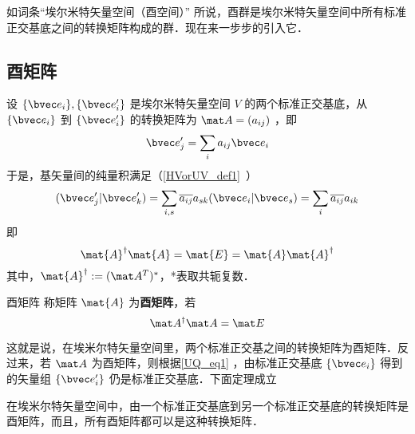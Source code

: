 
如词条“埃尔米特矢量空间（酉空间）” 所说，酉群是埃尔米特矢量空间中所有标准正交基底之间的转换矩阵构成的群．现在来一步步的引入它．
\subsection{酉矩阵}
设 $\{\bvec e_i\},\{\bvec e'_i\}$ 是埃尔米特矢量空间 $V$ 的两个标准正交基底，从 $\{\bvec e_i\}$ 到 $\{\bvec e'_i\}$ 的转换矩阵为 $\mat A=(a_{ij})$ ，即
\begin{equation}\label{UQ_eq1}
\bvec e'_j=\sum_{i}a_{ij}\bvec e_i
\end{equation}
于是，基矢量间的纯量积满足（\autoref{HVorUV_def1}~）
\begin{equation}
(\bvec e'_j|\bvec e'_k)=\sum_{i,s}\overline{a_{ij}}a_{sk}(\bvec e_i|\bvec e_s)=\sum_{i}\overline{a_{ij}}a_{ik}
\end{equation}
即
\begin{equation}\label{UQ_eq2}
\mat{A}^\dagger \mat{A}=\mat{E}=\mat{A} \mat{A}^\dagger
\end{equation}
其中，$\mat{A}^\dagger:=(\mat A^T)^*$，*表取共轭复数．
\begin{definition}{酉矩阵}
称矩阵 $\mat{A}$ 为\textbf{酉矩阵}，若
\begin{equation}
\mat A^\dagger \mat A=\mat E
\end{equation}
\end{definition}
这就是说，在埃米尔特矢量空间里，两个标准正交基之间的转换矩阵为酉矩阵．反过来，若 $\mat A$ 为酉矩阵，则根据\autoref{UQ_eq1} ，由标准正交基底 $\{\bvec e_i\}$ 得到的矢量组 $\{\bvec e'_i\}$ 仍是标准正交基底．下面定理成立
\begin{theorem}{}
在埃米尔特矢量空间中，由一个标准正交基底到另一个标准正交基底的转换矩阵是酉矩阵，而且，所有酉矩阵都可以是这种转换矩阵．
\end{theorem}
